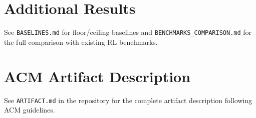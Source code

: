 \documentclass[manuscript,review,anonymous]{acmart}
\begin{document}
\section{Additional Results}
\label{app:results}

See \texttt{BASELINES.md} for floor/ceiling baselines and
\texttt{BENCHMARKS\_COMPARISON.md} for the full comparison with existing RL benchmarks.

\section{ACM Artifact Description}
\label{app:artifact}

See \texttt{ARTIFACT.md} in the repository for the complete artifact
description following ACM guidelines.
\end{document}
